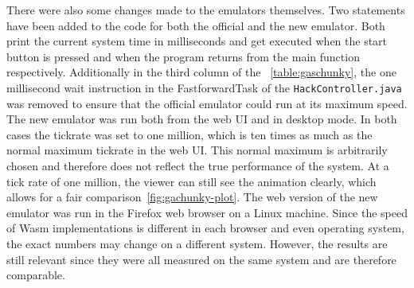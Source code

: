 There were also some changes made to the emulators themselves.
Two statements have been added to the code for both the official and the new emulator.
Both print the current system time in milliseconds and get executed when the start button is pressed and when the program returns from the main function respectively.
Additionally in the third column of the ~\cref{table:gaschunky}, the one millisecond wait instruction in the FastforwardTask of the \verb+HackController.java+ was removed to ensure that the official emulator could run at its maximum speed.
The new emulator was run both from the web UI and in desktop mode.
In both cases the tickrate was set to one million, which is ten times as much as the normal maximum tickrate in the web UI.
This normal maximum is arbitrarily chosen and therefore does not reflect the true performance of the system.
At a tick rate of one million, the viewer can still see the animation clearly, which allows for a fair comparison~\ref{fig:gachunky-plot}.
The web version of the new emulator was run in the Firefox web browser on a Linux machine.
Since the speed of Wasm implementations is different in each browser and even operating system, the exact numbers may change on a different system.
However, the results are still relevant since they were all measured on the same system and are therefore comparable.

